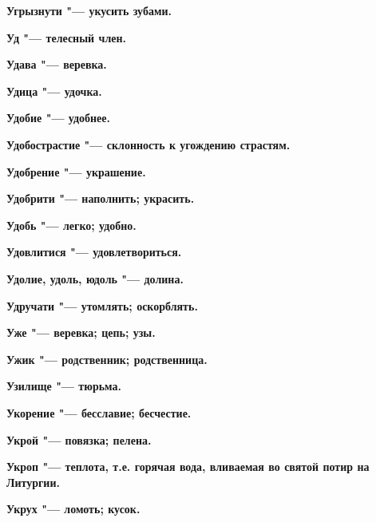 \bfseries Угрызнути \normalfont{} "--- укусить зубами. 




\bfseries Уд \normalfont{} "--- телесный член. 




\bfseries Удава \normalfont{} "--- веревка. 




\bfseries Удица \normalfont{} "--- удочка. 




\bfseries Удобие \normalfont{} "--- удобнее. 




\bfseries Удобострастие \normalfont{} "--- склонность к угождению страстям. 




\bfseries Удобрение \normalfont{} "--- украшение. 




\bfseries Удобрити \normalfont{} "--- наполнить; украсить. 




\bfseries Удобь \normalfont{} "--- легко; удобно. 




\bfseries Удовлитися \normalfont{} "--- удовлетвориться. 




\bfseries Удолие, удоль, юдоль \normalfont{} "--- долина. 




\bfseries Удручати \normalfont{} "--- утомлять; оскорблять. 




\bfseries Уже \normalfont{} "--- веревка; цепь; узы. 




\bfseries Ужик \normalfont{} "--- родственник; родственница. 




\bfseries Узилище \normalfont{} "--- тюрьма. 




\bfseries Укорение \normalfont{} "--- бесславие; бесчестие. 




\bfseries Укрой \normalfont{} "--- повязка; пелена. 




\bfseries Укроп \normalfont{} "--- теплота, т.е. горячая вода, вливаемая во святой потир на Литургии. 




\bfseries Укрух \normalfont{} "--- ломоть; кусок. 




